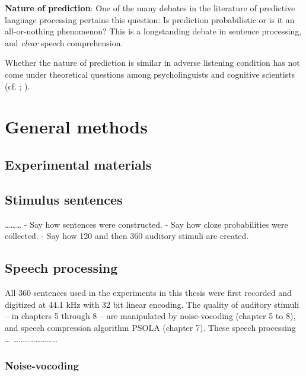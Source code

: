 \documentclass[a4paper, nobind]{templates/ociamthesis}
\begin{document}
\textbf{Nature of prediction}:
One of the many debates in the literature of predictive language processing pertains this question: Is prediction probabilistic or is it an all-or-nothing phenomenon?
This is a longstanding debate in sentence processing, and \emph{clear} speech comprehension.

Whether the nature of prediction is similar in adverse listening condition has not come under theoretical questions among psycholinguists and cognitive scientists (cf. \textcite{Strauss2013}; \textcite{Corps2020}).

\hypertarget{general-methods}{%
\chapter{General methods}\label{general-methods}}

\hypertarget{experimental-materials}{%
\section{Experimental materials}\label{experimental-materials}}

\hypertarget{stimulus-sentences}{%
\section{Stimulus sentences}\label{stimulus-sentences}}

\ldots\ldots\ldots{}
- Say how sentences were constructed.
- Say how cloze probabilities were collected.
- Say how 120 and then 360 auditory stimuli are created.

\hypertarget{speech-processing}{%
\section{Speech processing}\label{speech-processing}}

All 360 sentences used in the experiments in this thesis were first recorded and digitized at 44.1 kHz with 32 bit linear encoding.
The quality of auditory stimuli -- in chapters 5 through 8 -- are manipulated by noise-vocoding (chapter 5 to 8), and speech compression algorithm PSOLA (chapter 7).
These speech processing \ldots{} \ldots\ldots\ldots\ldots\ldots\ldots\ldots\ldots{}

\hypertarget{noise-vocoding}{%
\subsection{Noise-vocoding}\label{noise-vocoding}}
\end{document}
